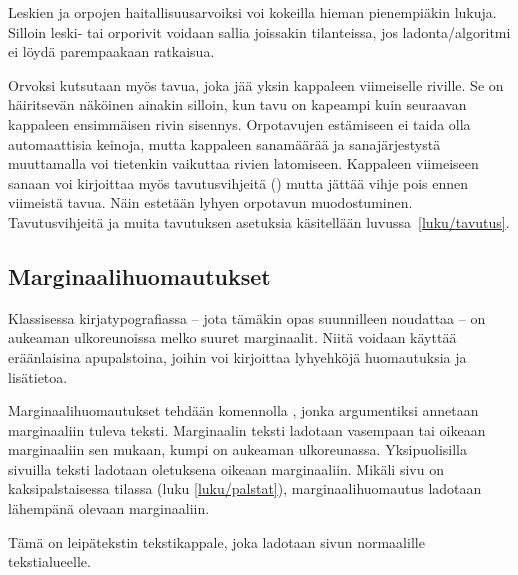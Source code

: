 \begin{koodilohkosis}
\end{koodilohkosis}

\noindent
Leskien ja orpojen haitallisuusarvoiksi voi kokeilla hieman pienempiäkin
lukuja. Silloin leski- tai orporivit voidaan sallia joissakin
tilanteissa, jos ladonta\-/algoritmi ei löydä parempaakaan ratkaisua.

Orvoksi kutsutaan myös tavua, joka jää yksin kappaleen viimeiselle
riville. Se on häiritsevän näköinen ainakin silloin, kun tavu on
kapeampi kuin seuraavan kappaleen ensimmäisen rivin sisennys.
Orpotavujen estämiseen ei taida olla automaattisia keinoja, mutta
kappaleen sanamäärää ja sanajärjestystä muuttamalla voi tietenkin
vaikuttaa rivien latomiseen. Kappaleen viimeiseen sanaan voi kirjoittaa
myös tavutusvihjeitä (\komento{-}) mutta jättää vihje pois ennen
viimeistä tavua. Näin estetään lyhyen orpotavun muodostuminen.
Tavutusvihjeitä ja muita tavutuksen asetuksia käsitellään
luvussa~\ref{luku/tavutus}.

\subsection{Marginaalihuomautukset}
\label{luku/marginaalihuomautukset}

Klassisessa kirjatypografiassa -- jota tämäkin opas suunnilleen
noudattaa -- on aukeaman ulkoreunoissa melko suuret marginaalit. Niitä
voidaan käyttää eräänlaisina apupalstoina, joihin voi kirjoittaa
lyhyehköjä huomautuksia ja lisätietoa.

Marginaalihuomautukset tehdään komennolla , jonka
argumentiksi annetaan marginaaliin tuleva teksti. Marginaalin teksti
ladotaan vasempaan tai oikeaan marginaaliin sen mukaan, kumpi on
aukeaman ulkoreunassa. Yksipuolisilla sivuilla teksti ladotaan
oletuksena oikeaan marginaaliin. Mikäli sivu on kaksipalstaisessa
tilassa (luku \ref{luku/palstat}), marginaalihuomautus ladotaan
lähempänä olevaan marginaaliin.

\begin{koodilohkosis}
Tämä on leipätekstin tekstikappale,
joka ladotaan sivun normaalille tekstialueelle.
\end{koodilohkosis}


